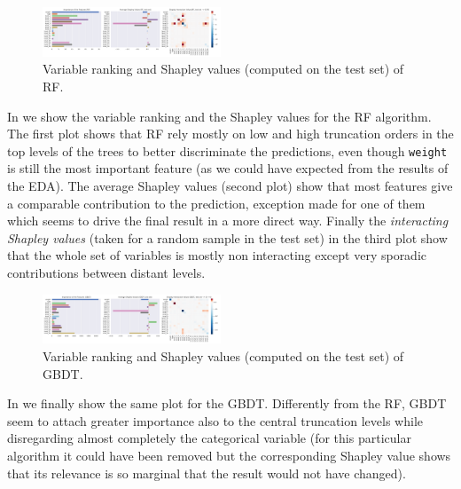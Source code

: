 \begin{figure}[htbp]
  \centering
  \includegraphics[width=0.475\textwidth]{img/rnd_for_shapley}
  \caption{Variable ranking and Shapley values (computed on the test set) of
  RF.}
  \label{fig:ml:rnd_for_shap}
\end{figure}

In  we show the variable ranking and the Shapley
values for the RF algorithm.
The first plot shows that RF rely mostly on low and high truncation orders in
the top levels of the trees to better discriminate the predictions, even though
\texttt{weight} is still the most important feature (as we could have expected
from the results of the EDA).
The average Shapley values (second plot) show that most features give a comparable contribution to the prediction, exception made for one of them which seems to drive the final result in a more direct way.
Finally the \textit{interacting Shapley values} (taken for a random sample in
the test set) in the third plot show that the whole set of variables is mostly
non interacting except very sporadic contributions between distant levels.

\begin{figure}[htbp]
  \centering
  \includegraphics[width=0.475\textwidth]{img/grd_bst_shapley}
  \caption{Variable ranking and Shapley values (computed on the test set) of GBDT.}
  \label{fig:ml:grd_bst_shap}
\end{figure}

In  we finally show the same plot for the GBDT.
Differently from the RF, GBDT seem to attach greater importance also to the
central truncation levels while disregarding almost completely the categorical
variable (for this particular algorithm it could have been removed but the
corresponding Shapley value shows that its relevance is so marginal that the
result would not have changed).
